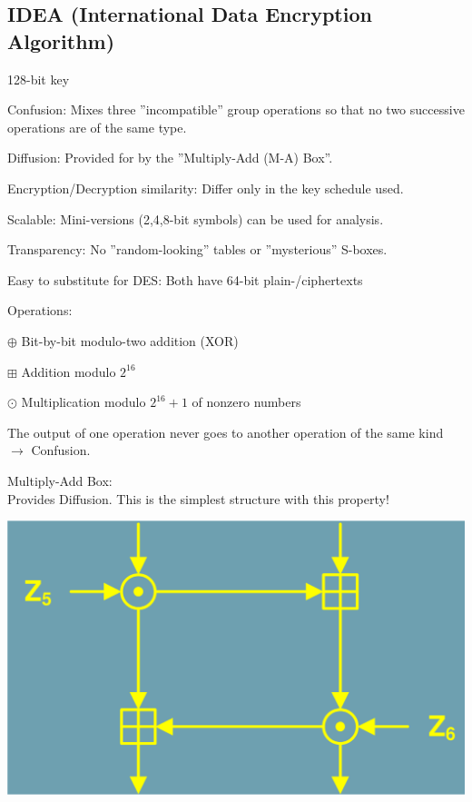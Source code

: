 \subsection{IDEA (International Data Encryption Algorithm)}
\begin{multicols}{2}
\begin{liste}
	\item 128-bit key
	\item Confusion: Mixes three ''incompatible'' group operations so that no two successive operations are of the same type.
	\item Diffusion: Provided for by the ''Multiply-Add (M-A) Box''.
	\item Encryption/Decryption similarity: Differ only in the key schedule used.
	\item Scalable: Mini-versions (2,4,8-bit symbols) can be used for analysis.
	\item Transparency: No ''random-looking'' tables or ''mysterious'' S-boxes.
	\item Easy to substitute for DES: Both have 64-bit plain-/ciphertexts
\end{liste}

Operations:
\begin{liste}
	\item [\-] $\oplus$ Bit-by-bit modulo-two addition (XOR)
	\item [\-] $\boxplus$ Addition modulo $2^{16}$
	\item [\-] $\odot$ Multiplication modulo $2^{16} + 1$ of nonzero numbers
\end{liste}
The output of one operation never goes to another operation of the same kind $\rightarrow$ Confusion.

\begin{minipage}{0.5\linewidth}
Multiply-Add Box:\\
Provides Diffusion. This is the simplest structure with this property!
\end{minipage}
\begin{minipage}{0.5\linewidth}
\includegraphics[width=0.8\linewidth]{./bilder/MultiplyAdd.png}
\end{minipage}


\end{multicols}
